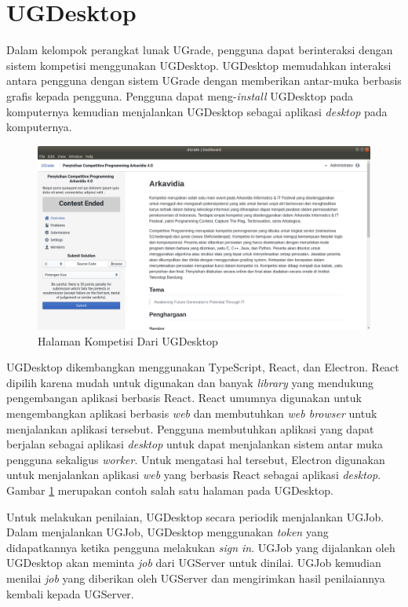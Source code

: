 \section{UGDesktop}

\par Dalam kelompok perangkat lunak UGrade, pengguna dapat berinteraksi dengan sistem kompetisi menggunakan UGDesktop. UGDesktop memudahkan interaksi antara pengguna dengan sistem UGrade dengan memberikan antar-muka berbasis grafis kepada pengguna. Pengguna dapat meng-\textit{install} UGDesktop pada komputernya kemudian menjalankan UGDesktop sebagai aplikasi \textit{desktop} pada komputernya.

\begin{figure}[ht!]
    \centering
    \includegraphics[width=\textwidth]{images/ugdesktop-example}
    \caption{Halaman Kompetisi Dari UGDesktop}
    \label{fig:ugdesktop-example}
\end{figure}

\par UGDesktop dikembangkan menggunakan TypeScript, React, dan Electron. React dipilih karena mudah untuk digunakan dan banyak \textit{library} yang mendukung pengembangan aplikasi berbasis React. React umumnya digunakan untuk mengembangkan aplikasi berbasis \textit{web} dan membutuhkan \textit{web browser} untuk menjalankan aplikasi tersebut. Pengguna membutuhkan aplikasi yang dapat berjalan sebagai aplikasi \textit{desktop} untuk dapat menjalankan sistem antar muka pengguna sekaligus \textit{worker}. Untuk mengatasi hal tersebut, Electron digunakan untuk menjalankan aplikasi \textit{web} yang berbasis React sebagai aplikasi \textit{desktop}. Gambar \ref{fig:ugdesktop-example} merupakan contoh salah satu halaman pada UGDesktop.

\par Untuk melakukan penilaian, UGDesktop secara periodik menjalankan UGJob. Dalam menjalankan UGJob, UGDesktop menggunakan \textit{token} yang didapatkannya ketika pengguna melakukan \textit{sign in}. UGJob yang dijalankan oleh UGDesktop akan meminta \textit{job} dari UGServer untuk dinilai. UGJob kemudian menilai \textit{job} yang diberikan oleh UGServer dan mengirimkan hasil penilaiannya kembali kepada UGServer.

